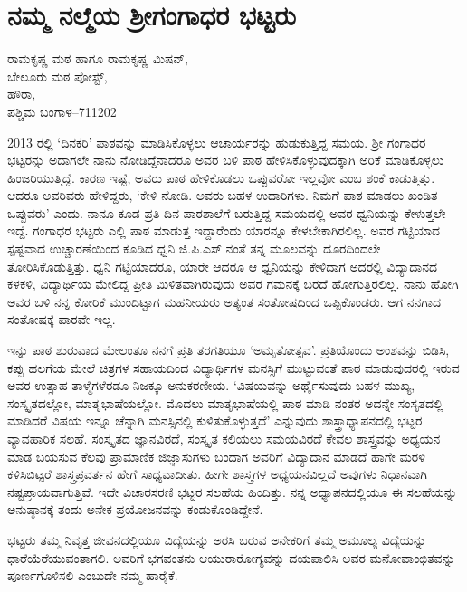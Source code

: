 \chapter{ನಮ್ಮ ನಲ್ಮೆಯ ಶ್ರೀಗಂಗಾಧರ ಭಟ್ಟರು}

\begin{center}
\smallskip

ರಾಮಕೃಷ್ಣ ಮಠ ಹಾಗೂ ರಾಮಕೃಷ್ಣ ಮಿಷನ್,\\
ಬೇಲೂರು ಮಠ ಪೋಸ್ಟ್,\\
ಹೌರಾ,\\ 
ಪಶ್ಚಿಮ ಬಂಗಾಳ–711202
\addrule
\end{center}

2013 ರಲ್ಲಿ `ದಿನಕರಿ' ಪಾಠವನ್ನು ಮಾಡಿಸಿಕೊಳ್ಳಲು ಆಚಾರ್ಯರನ್ನು ಹುಡುಕುತ್ತಿದ್ದ ಸಮಯ. ಶ್ರೀ ಗಂಗಾಧರ ಭಟ್ಟರನ್ನು ಅದಾಗಲೇ ನಾನು ನೋಡಿದ್ದೆನಾದರೂ ಅವರ ಬಳಿ ಪಾಠ ಹೇಳಿಸಿಕೊಳ್ಳುವುದಕ್ಕಾಗಿ ಅರಿಕೆ ಮಾಡಿಕೊಳ್ಳಲು ಹಿಂಜರಿಯುತ್ತಿದ್ದೆ. ಕಾರಣ ಇಷ್ಟೆ, ಅವರು ಪಾಠ ಹೇಳಿಕೊಡಲು ಒಪ್ಪುವರೋ ಇಲ್ಲವೋ ಎಂಬ ಶಂಕೆ ಕಾಡುತ್ತಿತ್ತು. ಆದರೂ ಅವರಿವರು ಹೇಳಿದ್ದರು, `ಕೇಳಿ ನೋಡಿ. ಅವರು ಬಹಳ ಉದಾರಿಗಳು. ನಿಮಗೆ ಪಾಠ ಮಾಡಲು ಖಂಡಿತ ಒಪ್ಪುವರು' ಎಂದು. ನಾನೂ ಕೂಡ ಪ್ರತಿ ದಿನ ಪಾಠಶಾಲೆಗೆ ಬರುತ್ತಿದ್ದ ಸಮಯದಲ್ಲಿ ಅವರ ಧ್ವನಿಯನ್ನು ಕೇಳುತ್ತಲೇ ಇದ್ದೆ. ಗಂಗಾಧರ ಭಟ್ಟರು ಎಲ್ಲಿ ಪಾಠ ಮಾಡುತ್ತ ಇದ್ದಾರೆಂದು ಯಾರನ್ನೂ ಕೇಳಬೇಕಾಗಿರಲಿಲ್ಲ. ಅವರ ಗಟ್ಟಿಯಾದ ಸ್ಪಷ್ಟವಾದ ಉಚ್ಚಾರಣೆಯಿಂದ ಕೂಡಿದ ಧ್ವನಿ ಜಿ.ಪಿ.ಎಸ್ ನಂತೆ ತನ್ನ ಮೂಲವನ್ನು ದೂರದಿಂದಲೇ ತೋರಿಸಿಕೊಡುತ್ತಿತ್ತು. ಧ್ವನಿ ಗಟ್ಟಿಯಾದರೂ, ಯಾರೇ ಆದರೂ ಆ ಧ್ವನಿಯನ್ನು ಕೇಳಿದಾಗ ಅದರಲ್ಲಿ ವಿದ್ಯಾದಾನದ ಕಳಕಳಿ, ವಿದ್ಯಾರ್ಥಿಯ ಮೇಲಿದ್ದ ಪ್ರೀತಿ ಮಿಳಿತವಾಗಿರುವುದು ಅವರ  ಗಮನಕ್ಕೆ ಬರದೆ ಹೋಗುತ್ತಿರಲಿಲ್ಲ. ನಾನು ಹೋಗಿ ಅವರ ಬಳಿ ನನ್ನ ಕೋರಿಕೆ ಮುಂದಿಟ್ಟಾಗ ಮಹನೀಯರು ಅತ್ಯಂತ ಸಂತೋಷದಿಂದ ಒಪ್ಪಿಕೊಂಡರು. ಆಗ ನನಗಾದ ಸಂತೋಷಕ್ಕೆ ಪಾರವೇ ಇಲ್ಲ. 

ಇನ್ನು ಪಾಠ ಶುರುವಾದ ಮೇಲಂತೂ ನನಗೆ ಪ್ರತಿ ತರಗತಿಯೂ `ಅಮೃತೋತ್ಸವ'. ಪ್ರತಿಯೊಂದು ಅಂಶವನ್ನು ಬಿಡಿಸಿ, ಕಪ್ಪು ಹಲಗೆಯ ಮೇಲೆ ಚಿತ್ರಗಳ ಸಹಾಯದಿಂದ ವಿದ್ಯಾರ್ಥಿಗಳ ಮನಸ್ಸಿಗೆ ಮುಟ್ಟುವಂತೆ ಪಾಠ ಮಾಡುವುದರಲ್ಲಿ ಇರುವ ಅವರ ಉತ್ಸಾಹ ತಾಳ್ಮೆಗಳೆರಡೂ ನಿಜಕ್ಕೂ ಅನುಕರಣೀಯ.  `ವಿಷಯವನ್ನು ಅರ್ಥೈಸುವುದು ಬಹಳ ಮುಖ್ಯ, ಸಂಸ್ಕೃತದಲ್ಲೋ, ಮಾತೃಭಾಷೆಯಲ್ಲೋ. ಮೊದಲು ಮಾತೃಭಾಷೆಯಲ್ಲಿ ಪಾಠ ಮಾಡಿ ನಂತರ ಅದನ್ನೇ ಸಂಸೃತದಲ್ಲಿ ಮಾಡಿದರೆ ವಿಷಯ ಇನ್ನೂ ಚೆನ್ನಾಗಿ ಮನಸ್ಸಿನಲ್ಲಿ ಕುಳಿತುಕೊಳ್ಳುತ್ತದೆ' ಎನ್ನುವುದು ಶಾಸ್ತ್ರಾಧ್ಯಾಪನದಲ್ಲಿ ಭಟ್ಟರ ವ್ಯಾವಹಾರಿಕ ಸಲಹೆ. ಸಂಸ್ಕೃತದ ಜ್ಞಾನವಿರದೆ, ಸಂಸ್ಕೃತ ಕಲಿಯಲು ಸಮಯವಿರದೆ  ಕೇವಲ ಶಾಸ್ತ್ರವನ್ನು ಅಧ್ಯಯನ ಮಾಡ ಬಯಸುವ ಕೆಲವು ಪ್ರಾಮಾಣಿಕ ಜಿಜ್ಞಾಸುಗಳು ಬಂದಾಗ ಅವರಿಗೆ ವಿದ್ಯಾದಾನ ಮಾಡದೆ ಹಾಗೇ ಮರಳಿ ಕಳಿಸಿಬಿಟ್ಟರೆ ಶಾಸ್ತ್ರಪ್ರವರ್ತನ ಹೇಗೆ ಸಾಧ್ಯವಾದೀತು. ಹೀಗೇ ಶಾಸ್ತ್ರಗಳ ಅಧ್ಯಯನವಿಲ್ಲದೆ ಅವುಗಳು ನಿಧಾನವಾಗಿ ನಷ್ಟಪ್ರಾಯವಾಗುತ್ತಿವೆ. ಇದೇ ವಿಚಾರಸರಣಿ ಭಟ್ಟರ ಸಲಹೆಯ ಹಿಂದಿತ್ತು. ನನ್ನ ಅಧ್ಯಾಪನದಲ್ಲಿಯೂ ಈ ಸಲಹೆಯನ್ನು ಅನುಷ್ಠಾನಕ್ಕೆ ತಂದು ಅನೇಕ ಪ್ರಯೋಜನವನ್ನು ಕಂಡುಕೊಂಡಿದ್ದೇನೆ. 

ಭಟ್ಟರು ತಮ್ಮ ನಿವೃತ್ತ ಜೀವನದಲ್ಲಿಯೂ ವಿದ್ಯೆಯನ್ನು ಅರಸಿ ಬರುವ ಅನೇಕರಿಗೆ ತಮ್ಮ ಅಮೂಲ್ಯ ವಿದ್ಯೆಯನ್ನು ಧಾರೆಯೆರೆಯುವಂತಾಗಲಿ. ಅವರಿಗೆ ಭಗವಂತನು ಆಯುರಾರೋಗ್ಯವನ್ನು ದಯಪಾಲಿಸಿ ಅವರ ಮನೋವಾಂಛಿತವನ್ನು ಪೂರ್ಣಗೊಳಿಸಲಿ ಎಂಬುದೇ ನಮ್ಮ ಹಾರೈಕೆ.

\articleend
